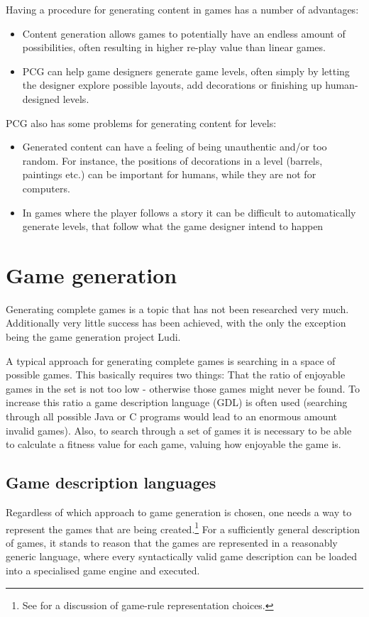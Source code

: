 \documentclass[a4paper,titlepage,final, twoside]{report}
\begin{document}
Having a procedure for generating content in games has a number of advantages:

\begin{itemize}
  \item Content generation allows games to potentially have an endless amount of possibilities, often resulting in higher re-play value than linear games. 
  \item PCG can help game designers generate game levels, often simply by letting the designer explore possible layouts, add decorations or finishing up human-designed levels.
\end{itemize}

PCG also has some problems for generating content for levels:

\begin{itemize}
  \item Generated content can have a feeling of being unauthentic and/or too random. For instance, the positions of decorations in a level (barrels, paintings etc.) can be important for humans, while they are not for computers.
  \item In games where the player follows a story it can be difficult to automatically generate levels, that follow what the game designer intend to happen%
\end{itemize}




\section{Game generation}
Generating complete games is a topic that has not been researched very much. Additionally very little success has been achieved, with the only the exception being the game generation project Ludi.

A typical approach for generating complete games is searching in a space of possible games. This basically requires two things: That the ratio of enjoyable games in the set is not too low - otherwise those games might never be found. To increase this ratio a game description language (GDL) is often used (searching through all possible Java or C programs would lead to an enormous amount invalid games).
Also, to search through a set of games it is necessary to be able to calculate a fitness value for each game, valuing how enjoyable the game is.

\subsection{Game description languages}
Regardless of which approach to game generation is chosen, one needs a way to represent the games that are being created.\footnote{See \citet{pcgbook:ch6} for a discussion of game-rule representation choices.} For a sufficiently general description of games, it stands to reason that the games are represented in a reasonably generic language, where every syntactically valid game description can be loaded into a specialised game engine and executed. 
\end{document}
